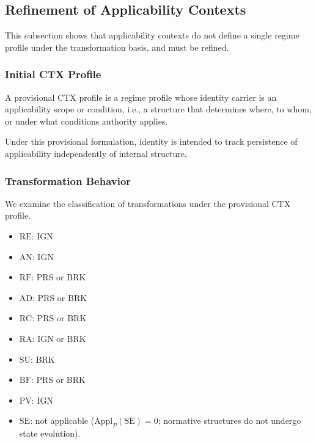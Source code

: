 
\subsection{Refinement of Applicability Contexts}
\label{subsec:ctx_split}

This subsection shows that applicability contexts do not define a single
regime profile under the transformation basis, and must be refined.

\subsubsection{Initial CTX Profile}

\begin{definition}
A provisional CTX profile is a regime profile whose identity carrier is
an applicability scope or condition, i.e., a structure that determines
where, to whom, or under what conditions authority applies.
\end{definition}


Under this provisional formulation, identity is intended to track persistence
of applicability independently of internal structure.


\subsubsection{Transformation Behavior}

We examine the classification of transformations under the provisional CTX profile.

\begin{itemize}
\item $\mathrm{RE}$: IGN
\item $\mathrm{AN}$: IGN
\item $\mathrm{RF}$: PRS or BRK
\item $\mathrm{AD}$: PRS or BRK
\item $\mathrm{RC}$: PRS or BRK
\item $\mathrm{RA}$: IGN or BRK
\item $\mathrm{SU}$: BRK
\item $\mathrm{BF}$: PRS or BRK
\item $\mathrm{PV}$: IGN
\item $\mathrm{SE}$: not applicable
      ($\mathrm{Appl}_P(\mathrm{SE}) = 0$;
      normative structures do not undergo state evolution).
\end{itemize}


